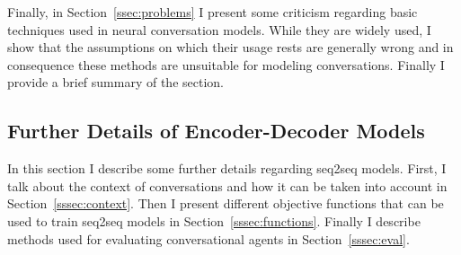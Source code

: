 \documentclass[12pt]{article}
\begin{document}
Finally, in Section~\ref{ssec:problems} I present some criticism regarding basic techniques used in neural conversation models. While they are widely used, I show that the assumptions on which their usage rests are generally wrong and  in consequence these methods are unsuitable for modeling conversations. Finally I provide a brief summary of the section.

\subsection{Further Details of Encoder-Decoder Models} \label{ssec:31}
In this section I describe some further details regarding seq2seq models. First, I talk about the context of conversations and how it can be taken into account in Section~\ref{sssec:context}. Then I present different objective functions that can be used to train seq2seq models in Section~\ref{sssec:functions}. Finally I describe methods used for evaluating conversational agents in Section~\ref{sssec:eval}.
\end{document}
